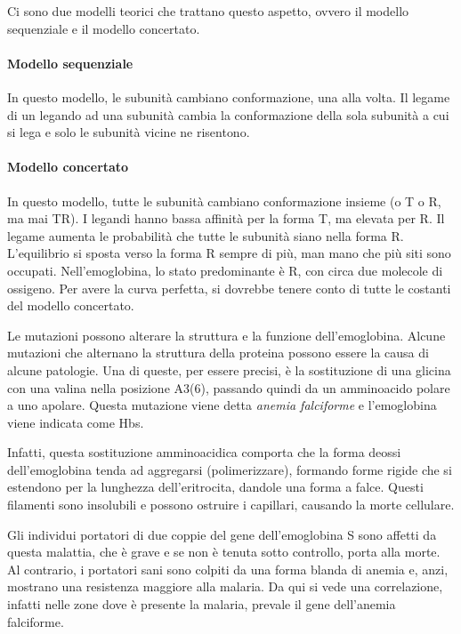 Ci sono due modelli teorici che trattano questo aspetto, ovvero il modello sequenziale e il modello concertato.

\paragraph{Modello sequenziale}

In questo modello, le subunità cambiano conformazione, una alla volta. Il legame di un legando ad una subunità cambia la conformazione della sola subunità a cui si lega e solo le subunità vicine ne risentono.


\paragraph{Modello concertato}

In questo modello, tutte le subunità cambiano conformazione insieme (o T o R, ma mai TR). I legandi hanno bassa affinità per la forma T, ma elevata per R. Il legame aumenta le probabilità che tutte le subunità siano nella forma R. L'equilibrio si sposta verso la forma R sempre di più, man mano che più siti sono occupati.
Nell'emoglobina, lo stato predominante è R, con circa due molecole di ossigeno.
Per avere la curva perfetta, si dovrebbe tenere conto di tutte le costanti del modello concertato.


Le mutazioni possono alterare la struttura e la funzione dell'emoglobina. Alcune mutazioni che alternano la struttura della proteina possono essere la causa di alcune patologie. Una di queste, per essere precisi, è la sostituzione di una glicina con una valina nella posizione A3(6)\beta{}, passando quindi da un amminoacido polare a uno apolare.
Questa mutazione viene detta \emph{anemia falciforme} e l'emoglobina viene indicata come Hbs.

Infatti, questa sostituzione amminoacidica comporta che la forma deossi dell'emoglobina tenda ad aggregarsi (polimerizzare), formando forme rigide che si estendono per la lunghezza dell'eritrocita, dandole una forma a falce.
Questi filamenti sono insolubili e possono ostruire i capillari, causando la morte cellulare.


Gli individui portatori di due coppie del gene dell'emoglobina S sono affetti da questa malattia, che è grave e se non è tenuta sotto controllo, porta alla morte. Al contrario, i portatori sani sono colpiti da una forma blanda di anemia e, anzi, mostrano una resistenza maggiore alla malaria. Da qui si vede una correlazione, infatti nelle zone dove è presente la malaria, prevale il gene dell'anemia falciforme.


